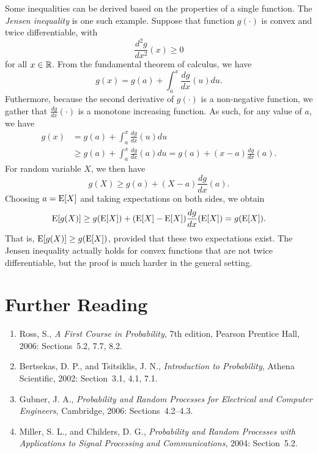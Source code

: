 Some inequalities can be derived based on the properties of a single function.
The \emph{Jensen inequality} is one such example. 
Suppose that function $g(\cdot)$ is convex and twice differentiable, with
\begin{equation*}
\frac{d^2 g}{dx^2} (x) \geq 0
\end{equation*}
for all $x \in \mathbb{R}$.
From the fundamental theorem of calculus, we have
\begin{equation*}
g(x) = g(a) + \int_a^x \frac{dg}{dx} (u) du .
\end{equation*}
Futhermore, because the second derivative of $g(\cdot)$ is a non-negative function, we gather that $\frac{dg}{dx} (\cdot)$ is a monotone increasing function.
As such, for any value of $a$, we have
\begin{equation*}
\begin{split}
g(x) &= g(a) + \int_a^x \frac{dg}{dx} (u) du \\
&\geq g(a) + \int_a^x \frac{dg}{dx} (a) du
= g(a) + (x-a) \frac{dg}{dx} (a) .
\end{split}
\end{equation*}
For random variable $X$, we then have
\begin{equation*}
g(X) \geq g(a) + (X-a) \frac{dg}{dx} (a) .
\end{equation*}
Choosing $a = \mathrm{E} [X]$ and taking expectations on both sides, we obtain
\begin{equation*}
\mathrm{E} [g(X)] \geq g(\mathrm{E} [X])
+ (\mathrm{E} [X]-\mathrm{E} [X]) \frac{dg}{dx} (\mathrm{E} [X])
= g(\mathrm{E} [X]) .
\end{equation*}
That is, $\mathrm{E} [g(X)] \geq g(\mathrm{E} [X])$, provided that these two expectations exist.
The Jensen inequality actually holds for convex functions that are not twice differentiable, but the proof is much harder in the general setting.


\section*{Further Reading}

\begin{small}
\begin{enumerate}
\item Ross, S., \emph{A First Course in Probability}, 7th edition, Pearson Prentice Hall, 2006: Sections~5.2, 7.7, 8.2.
\item Bertsekas, D. P., and Tsitsiklis, J. N., \emph{Introduction to Probability}, Athena Scientific, 2002: Section~3.1, 4.1, 7.1.
\item Gubner, J. A., \emph{Probability and Random Processes for Electrical and Computer Engineers}, Cambridge, 2006: Sections~4.2--4.3.
\item Miller, S. L., and Childers, D. G., \emph{Probability and Random Processes with Applications to Signal Processing and Communications}, 2004: Section~5.2.
\end{enumerate}
\end{small}

